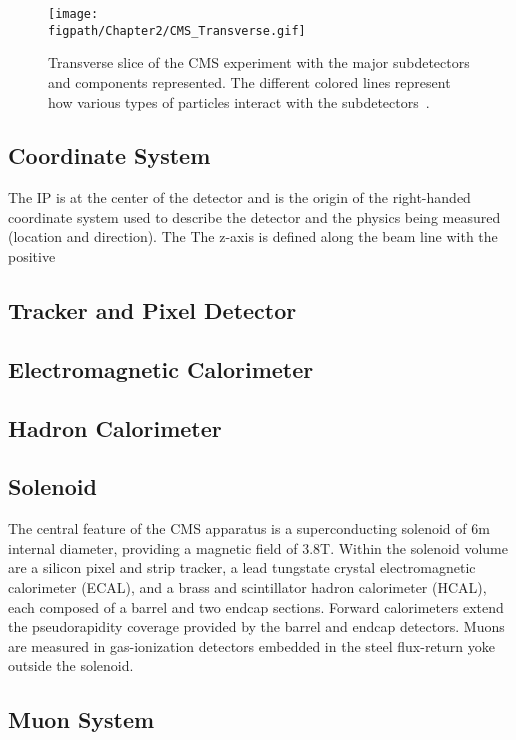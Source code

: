 \begin{figure}[!hbt]
	\centering
	\texttt{[image: \\figpath/Chapter2/CMS\_Transverse.gif]}
	\caption{Transverse slice of the CMS experiment with the major subdetectors and components represented. The different colored lines represent how various types of particles interact with the subdetectors~\cite{CMSSlice}.}
	\label{fig:CMS_transverse}
\end{figure}

\subsection{Coordinate System}

The IP is at the center of the detector and is the origin of the right-handed coordinate system used to describe the detector and the physics being measured (location and direction). The The z-axis is defined along the beam line with the positive 


\subsection{Tracker and Pixel Detector}
\label{sec:tracker_and_pixel}
\subsection{Electromagnetic Calorimeter}
\subsection{Hadron Calorimeter}
\label{sec:hadron_calorimeter}
\subsection{Solenoid}

The central feature of the CMS apparatus is a superconducting solenoid of 6\unit{m} internal diameter, providing a magnetic field of 3.8\unit{T}. Within the solenoid volume are a silicon pixel and strip tracker, a lead tungstate crystal electromagnetic calorimeter (ECAL), and a brass and scintillator hadron calorimeter (HCAL), each composed of a barrel and two endcap sections. Forward calorimeters extend the pseudorapidity coverage provided by the barrel and endcap detectors. Muons are measured in gas-ionization detectors embedded in the steel flux-return yoke outside the solenoid. 

\subsection{Muon System}
